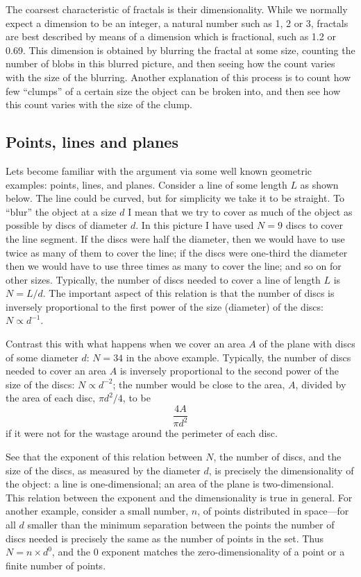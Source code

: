 \documentclass[11pt,a4paper]{article}
\begin{document}
The coarsest characteristic of fractals is their dimensionality.  
While we normally expect a dimension to be an integer, a natural 
number such as 1, 2 or 3, fractals are best described by means of a 
dimension which is fractional, such as 1.2 or 0.69.  This dimension 
is obtained by blurring the fractal at some size, counting the number 
of blobs in this blurred picture, and then seeing how the count 
varies with the size of the blurring.  Another explanation of this 
process is to count how few ``clumps'' of a certain size the object can 
be broken into, and then see how this count varies with the size of 
the clump.  

\subsection{Points, lines and planes}
\label{seuclid}

Lets become familiar with the argument via some well known geometric 
examples: points, lines, and planes.  Consider a line of some length 
$L$ as shown below.  The line could be curved, but for simplicity 
we take it to be straight.  To ``blur'' the object at a size
\(
	d
\)
I mean that we try to cover as much of the object as possible by discs 
of diameter $d$.  In this picture I have used
\(
	N=9
\)
discs to cover the line segment.  If the discs were half the diameter, 
then we would have to use twice as many of them to cover the line; if 
the discs were one-third the diameter then we would have to use three 
times as many to cover the line; and so on for other sizes.  
Typically, the number of discs needed to cover a line of length $L$ is $N=L/d$.  The important aspect of this relation is that the 
number of discs is inversely proportional to the first power of the 
size (diameter) of the discs: $N\propto d^{-1}$.

Contrast this with what happens when we cover an area $A$ of the 
plane with discs of some diameter $d$:
\(
	N=34
\)
 in the above example.  Typically, 
the number of discs needed to cover an area 
\(
	A
\)
is inversely proportional to the second power of the size of the 
discs: $N\propto d^{-2}$; the number would be close to the area, 
$A$, divided by the area of each disc, $\pi d^2/4$, to be  
\[
	\frac{4A}{\pi d^2}
\]
if it were not for the wastage around the perimeter of 
each disc.

See that the exponent of this relation between $N$, the number of 
discs, and the size of the discs, as measured by the diameter $d$, 
is precisely the dimensionality of the object: a line is 
one-dimensional; an area of the plane is two-dimensional.  This 
relation between the exponent and the dimensionality is true in 
general.  For another example, consider a small number, $n$, of 
points distributed in space---for all
\(
	d
\)
smaller than the minimum separation between the points the number of 
discs needed is precisely the same as the number of points in the set.  
Thus $N=n\times d^0$, and the 0 exponent matches the 
zero-dimensionality of a point or a finite number of points.
\end{document}
